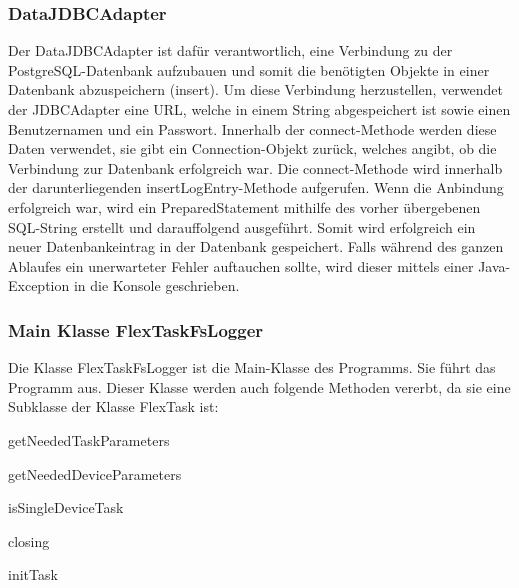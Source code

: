 \subsubsection{DataJDBCAdapter}
Der DataJDBCAdapter ist dafür verantwortlich, eine Verbindung zu der PostgreSQL-Datenbank aufzubauen und somit die benötigten Objekte in einer Datenbank abzuspeichern (insert). Um diese Verbindung herzustellen, verwendet der JDBCAdapter eine URL, welche in einem String abgespeichert ist sowie einen Benutzernamen und ein Passwort. Innerhalb der connect-Methode werden diese Daten verwendet, sie gibt ein Connection-Objekt zurück, welches angibt, ob die Verbindung zur Datenbank erfolgreich war. Die connect-Methode wird innerhalb der darunterliegenden insertLogEntry-Methode aufgerufen. Wenn die Anbindung erfolgreich war, wird ein PreparedStatement mithilfe des vorher übergebenen SQL-String erstellt und darauffolgend ausgeführt. Somit wird erfolgreich ein neuer Datenbankeintrag in der Datenbank gespeichert. Falls während des ganzen Ablaufes ein unerwarteter Fehler auftauchen sollte, wird dieser mittels einer Java-Exception in die Konsole geschrieben.
 
\subsubsection{Main Klasse FlexTaskFsLogger}
Die Klasse FlexTaskFsLogger ist die Main-Klasse des Programms. Sie führt das Programm aus. Dieser Klasse werden auch folgende Methoden vererbt, da sie eine Subklasse der Klasse FlexTask ist:
\begin{compactitem}
    \item getNeededTaskParameters
    \item getNeededDeviceParameters
    \item isSingleDeviceTask
    \item closing
    \item initTask
\end{compactitem}
 

